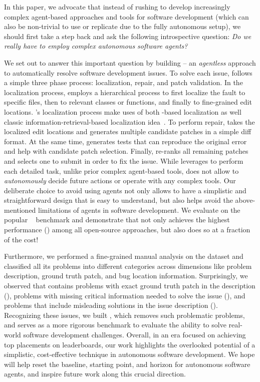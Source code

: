 In this paper, we advocate that instead of rushing to develop increasingly complex \llm agent-based approaches and tools for software development (which can also be non-trivial to use or replicate due to the fully autonomous setup), we should first take a step back and ask the following introspective question: \emph{Do we really have to employ complex autonomous software agents?}

 We set out to answer this important question by building \tech{} -- an \emph{agentless} approach to automatically resolve software development {issues}.
To solve each issue, \tech follows a simple three phase process: localization, repair, and patch validation. 
In the localization process, \tech employs a hierarchical process to first localize the fault to specific files, then to relevant classes or functions, and finally to fine-grained edit locations.
\tech's localization process make uses of both \llm-based localization as well classic information-retrieval-based localization idea~\cite{zhou2012should}.
To perform repair, \tech takes the localized edit locations and generates multiple candidate patches in a simple diff format. 
At the same time, \tech generates \reproduction tests that can reproduce the original error and help with candidate patch selection.
Finally, \tech re-ranks all remaining patches and selects one to submit in order to fix the issue. 
While \tech leverages  to perform each detailed task, unlike prior complex agent-based tools, \tech{} does not allow  to \emph{autonomously} decide future actions or operate with any complex tools.
Our deliberate choice {to avoid} using agents not only allows \tech to have a simplistic and straightforward design that {is easy to understand}, but also helps avoid the above-mentioned limitations of \llm agents in software development. 
We evaluate \tech on the popular \swebenchlite~\citep{swebenchlite} benchmark and demonstrate that \tech not only achieves the highest performance (\totalsolveperc{}) {among} all open-source approaches, but {also} does so at a fraction of the cost! 

Furthermore, we performed a fine-grained manual analysis on the \swebenchlite dataset and {classified} all its problems into different categories across dimensions like problem description, ground truth patch, and {bug} location information.
Surprisingly, we observed that \swebenchlite contains problems with exact ground truth patch in the description (\exactpatch), problems with missing critical information needed to solve the issue (\notenoughinfo), and problems that include misleading solutions in the issue description (\misleadingpatch).
Recognizing these issues, we built \swebenchlitefiltered{},
which removes such problematic problems, and serves as a more rigorous benchmark to evaluate the ability to solve real-world software development {challenges}.
Overall, {in an era focused on achieving} top placements on leaderboards, our work highlights the overlooked potential of a simplistic, cost-effective technique in autonomous software development.
We hope \tech will help reset the baseline, starting point, and horizon for autonomous software agents, and inspire future work along this crucial direction. 




